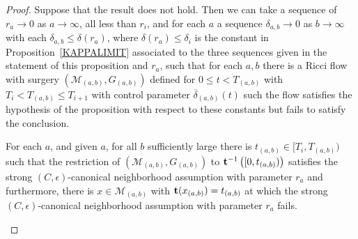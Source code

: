 \begin{proof}
Suppose that the result does not hold.
  Then we can take a sequence of $r_a\rightarrow 0$ as
 $a\rightarrow \infty$, all less than $r_i$, and for each $a$ a sequence
 $\delta_{a,b}\rightarrow 0$ as $b\rightarrow \infty$ with each
 $\delta_{a,b}\le \delta(r_a)$, where $\delta(r_a)\le \delta_i$ is the constant in Proposition~\ref{KAPPALIMIT}
 associated to the three sequences given in the statement of this proposition and $r_a$, such that for
 each $a,b$ there is a Ricci flow with surgery $({\mathcal
 M}_{(a,b)},G_{(a,b)})$ defined for $0\le t<T_{(a,b)}$ with $T_i<
 T_{(a,b)}\le T_{i+1}$ with control parameter $\overline \delta_{(a,b)}(t)$
 such the flow satisfies the hypothesis of the proposition with
 respect to these constants but fails to satisfy the conclusion.

\begin{lemma}
\label{lem:limit-canonical-neighborhood-fails-at-surgery-scale}\label{16.2}
For each $a$, and given $a$, for all $b$ sufficiently large there is $t_{(a,b)}\in
[T_i,T_{(a,b)})$ such that the restriction of $({\mathcal
M}_{(a,b)},G_{(a,b)})$ to ${\bf t}^{-1}\left([0,t_{(a,b)})\right)$
satisfies the strong $(C,\epsilon)$-canonical neighborhood
assumption with parameter $r_a$ and furthermore, there is
$x\in{\mathcal M}_{(a,b)}$ with ${\bf t}(x_{(a,b)})=t_{(a,b)}$ at
which the strong $(C,\epsilon)$-canonical neighborhood assumption
with parameter $r_a$ fails.
\end{lemma}


\end{proof}
